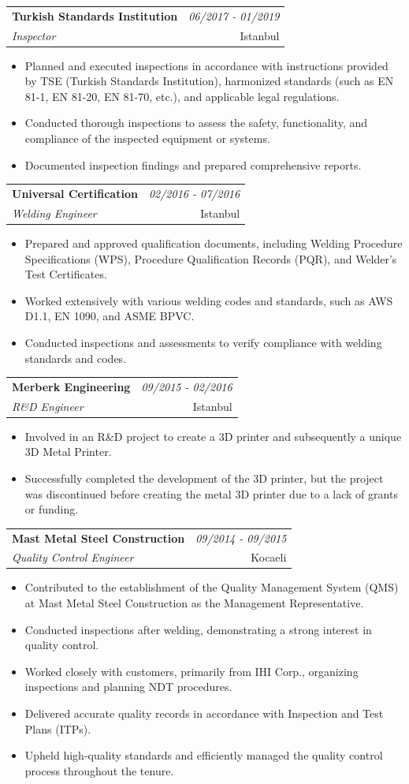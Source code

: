 \documentclass[a4paper,11pt]{article}
\makeatletter
\newcommand{\resumeSubheading}[4]{
\vspace{0.5mm}\item
    \begin{tabular*}{0.98\textwidth}[t]{l@{\extracolsep{\fill}}r}
        \textbf{#1} & \textit{\footnotesize{#4}} \\
        \textit{\footnotesize{#3}} &  \footnotesize{#2}\\
    \end{tabular*}
    \vspace{-2.0mm}
}
\newcommand{\resumeItemListStart}{\begin{justify}\begin{itemize}[leftmargin=3ex, rightmargin=2ex, noitemsep,labelsep=1.2mm,itemsep=0mm]\small}
\newcommand{\resumeItemListEnd}{\end{itemize}\end{justify}\vspace{-2mm}}
\makeatother
\begin{document}
    \resumeSubheading
      {Turkish Standards Institution}{Istanbul}
      {Inspector}{06/2017 - 01/2019}
        \resumeItemListStart
    \item {Planned and executed inspections in accordance with instructions provided by TSE (Turkish Standards Institution), harmonized standards (such as EN 81-1, EN 81-20, EN 81-70, etc.), and applicable legal regulations.}
    \item {Conducted thorough inspections to assess the safety, functionality, and compliance of the inspected equipment or systems.}
    \item {Documented inspection findings and prepared comprehensive reports.}
        \resumeItemListEnd

    \resumeSubheading
      {Universal Certification}{Istanbul}
      {Welding Engineer}{02/2016 - 07/2016}
        \resumeItemListStart
    \item {Prepared and approved qualification documents, including Welding Procedure Specifications (WPS), Procedure Qualification Records (PQR), and Welder's Test Certificates.}
    \item {Worked extensively with various welding codes and standards, such as AWS D1.1, EN 1090, and ASME BPVC.}
    \item {Conducted inspections and assessments to verify compliance with welding standards and codes.}
        \resumeItemListEnd

    \resumeSubheading
      {Merberk Engineering}{Istanbul}
      {R\&D Engineer}{09/2015 - 02/2016}
        \resumeItemListStart
    \item {Involved in an R\&D project to create a 3D printer and subsequently a unique 3D Metal Printer.}
    \item {Successfully completed the development of the 3D printer, but the project was discontinued before creating the metal 3D printer due to a lack of grants or funding.}
        \resumeItemListEnd

    \resumeSubheading
      {Mast Metal Steel Construction}{Kocaeli}
      {Quality Control Engineer}{09/2014 - 09/2015}
        \resumeItemListStart
    \item {Contributed to the establishment of the Quality Management System (QMS) at Mast Metal Steel Construction as the Management Representative.}
    \item {Conducted inspections after welding, demonstrating a strong interest in quality control.}
    \item {Worked closely with customers, primarily from IHI Corp., organizing inspections and planning NDT procedures.}
    \item {Delivered accurate quality records in accordance with Inspection and Test Plans (ITPs).}
    \item {Upheld high-quality standards and efficiently managed the quality control process throughout the tenure.}
        \resumeItemListEnd
\end{document}
